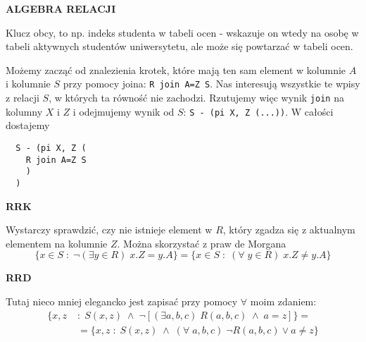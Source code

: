 \documentclass{article}
\begin{document}
\begin{solution}
  \textbf{\color{green}ALGEBRA RELACJI}

  Klucz obcy, to np. indeks studenta w tabeli ocen - wskazuje on wtedy na osobę w tabeli aktywnych studentów uniwersytetu, ale może się powtarzać w tabeli ocen.

  Możemy zacząć od znalezienia krotek, które mają ten sam element w kolumnie $A$ i kolumnie $S$ przy pomocy joina: \lstinline{R join A=Z S}. Nas interesują wszystkie te wpisy z relacji $S$, w których ta równość nie zachodzi. Rzutujemy więc wynik \lstinline{join} na kolumny $X$ i $Z$ i odejmujemy wynik od $S$: \lstinline{S - (pi X, Z (...))}. W całości dostajemy
  \begin{lstlisting}
  S - (pi X, Z (
    R join A=Z S
    )
  )
  \end{lstlisting}

  \textbf{\color{green}RRK}

  Wystarczy sprawdzić, czy nie istnieje element w $R$, który zgadza się z aktualnym elementem na kolumnie $Z$. Można skorzystać z praw de Morgana
  $$\{x\in S\;:\; \neg (\exists y\in R)\;x.Z=y.A\}=\{x\in S\;:\; (\forall\;y\in R)\;x.Z\neq y.A\}$$

  \textbf{\color{green}RRD}
  
  Tutaj nieco mniej elegancko jest zapisać przy pomocy $\forall$ moim zdaniem:
  \begin{align*}
    \{x, z\;&:\;S(x, z)\;\land\;\neg [(\exists a, b, c)\;R(a,b,c)\;\land \; a=z]\}=\\ 
    &=\{x,z\;:\;S(x,z)\;\land\;(\forall\;a, b, c)\;\neg R(a,b,c)\lor a\neq z\} 
  \end{align*}
\end{solution}
\end{document}
